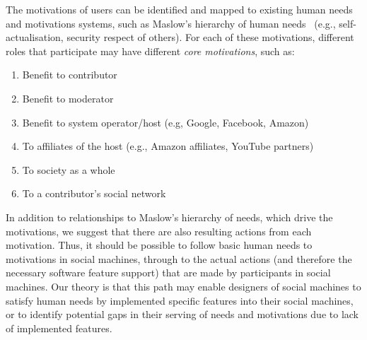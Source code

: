 \documentclass{sig-alternate}
\begin{document}
%
%
%

The motivations of users can be identified and mapped to existing human needs and motivations
systems, such as Maslow's hierarchy of human needs~\cite{maslow} (e.g., self-actualisation, security
respect of others). For each of these motivations, different roles that participate may have different {\it core motivations}, such as:

\begin{enumerate}
\item Benefit to contributor
\item Benefit to moderator
\item Benefit to system operator/host (e.g, Google, Facebook, Amazon)
\item To affiliates of the host (e.g., Amazon affiliates, YouTube partners)
\item To society as a whole
\item To a contributor's social network
\end{enumerate}

In addition to relationships to Maslow's hierarchy of needs, which drive the motivations,
we suggest that there are also resulting actions from each motivation. Thus, it should be
possible to follow basic human needs to motivations in social machines, through to the
actual actions (and therefore the necessary software feature support) that are made by
participants in social machines. Our theory is that this path may enable designers of
social machines to satisfy human needs by implemented specific features into their social
machines, or to identify potential gaps in their serving of needs and motivations due
to lack of implemented features.
\end{document}
